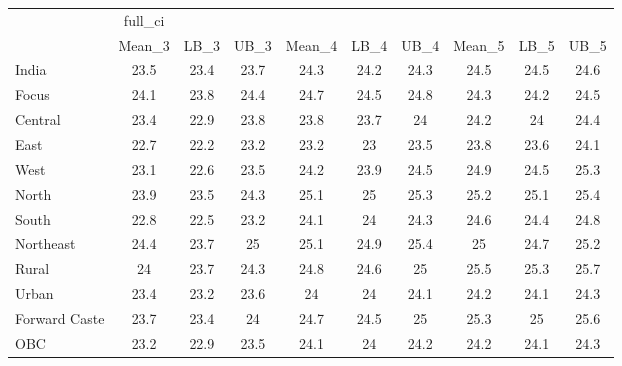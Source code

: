 \begin{tabular}{l*{9}{c}}
\toprule
                    &     full\_ci&            &            &            &            &            &            &            &            \\
                    &      Mean\_3&        LB\_3&        UB\_3&      Mean\_4&        LB\_4&        UB\_4&      Mean\_5&        LB\_5&        UB\_5\\
\midrule
India               &        23.5&        23.4&        23.7&        24.3&        24.2&        24.3&        24.5&        24.5&        24.6\\
Focus               &        24.1&        23.8&        24.4&        24.7&        24.5&        24.8&        24.3&        24.2&        24.5\\
Central             &        23.4&        22.9&        23.8&        23.8&        23.7&          24&        24.2&          24&        24.4\\
East                &        22.7&        22.2&        23.2&        23.2&          23&        23.5&        23.8&        23.6&        24.1\\
West                &        23.1&        22.6&        23.5&        24.2&        23.9&        24.5&        24.9&        24.5&        25.3\\
North               &        23.9&        23.5&        24.3&        25.1&          25&        25.3&        25.2&        25.1&        25.4\\
South               &        22.8&        22.5&        23.2&        24.1&          24&        24.3&        24.6&        24.4&        24.8\\
Northeast           &        24.4&        23.7&          25&        25.1&        24.9&        25.4&          25&        24.7&        25.2\\
Rural               &          24&        23.7&        24.3&        24.8&        24.6&          25&        25.5&        25.3&        25.7\\
Urban               &        23.4&        23.2&        23.6&          24&          24&        24.1&        24.2&        24.1&        24.3\\
Forward Caste       &        23.7&        23.4&          24&        24.7&        24.5&          25&        25.3&          25&        25.6\\
OBC                 &        23.2&        22.9&        23.5&        24.1&          24&        24.2&        24.2&        24.1&        24.3\\

\end{tabular}
